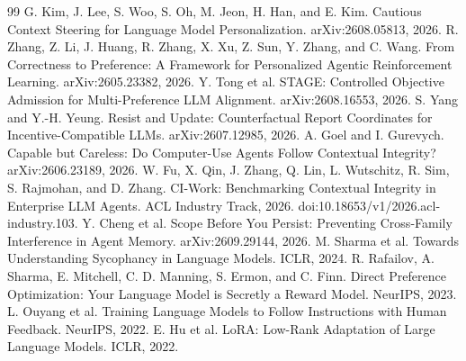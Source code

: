 \documentclass[10pt]{article}
\begin{document}
\begin{thebibliography}{99}
 G. Kim, J. Lee, S. Woo, S. Oh, M. Jeon, H. Han, and E. Kim. Cautious Context Steering for Language Model Personalization. arXiv:2608.05813, 2026.
 R. Zhang, Z. Li, J. Huang, R. Zhang, X. Xu, Z. Sun, Y. Zhang, and C. Wang. From Correctness to Preference: A Framework for Personalized Agentic Reinforcement Learning. arXiv:2605.23382, 2026.
 Y. Tong et al. STAGE: Controlled Objective Admission for Multi-Preference LLM Alignment. arXiv:2608.16553, 2026.
 S. Yang and Y.-H. Yeung. Resist and Update: Counterfactual Report Coordinates for Incentive-Compatible LLMs. arXiv:2607.12985, 2026.
 A. Goel and I. Gurevych. Capable but Careless: Do Computer-Use Agents Follow Contextual Integrity? arXiv:2606.23189, 2026.
 W. Fu, X. Qin, J. Zhang, Q. Lin, L. Wutschitz, R. Sim, S. Rajmohan, and D. Zhang. CI-Work: Benchmarking Contextual Integrity in Enterprise LLM Agents. ACL Industry Track, 2026. doi:10.18653/v1/2026.acl-industry.103.
 Y. Cheng et al. Scope Before You Persist: Preventing Cross-Family Interference in Agent Memory. arXiv:2609.29144, 2026.
 M. Sharma et al. Towards Understanding Sycophancy in Language Models. ICLR, 2024.
 R. Rafailov, A. Sharma, E. Mitchell, C. D. Manning, S. Ermon, and C. Finn. Direct Preference Optimization: Your Language Model is Secretly a Reward Model. NeurIPS, 2023.
 L. Ouyang et al. Training Language Models to Follow Instructions with Human Feedback. NeurIPS, 2022.
 E. Hu et al. LoRA: Low-Rank Adaptation of Large Language Models. ICLR, 2022.
\end{thebibliography}
\end{document}

